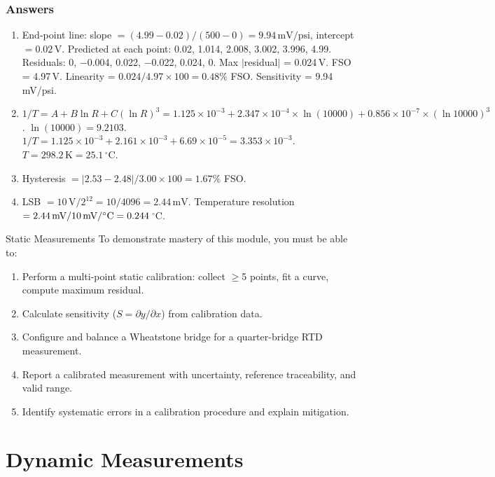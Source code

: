 \documentclass[11pt,letterpaper,twoside,openany]{book}
\newcommand{\degC}{\ensuremath{{}^{\circ}\text{C}}}
\begin{document}
\subsection{Answers}
\begin{enumerate}[leftmargin=1.5em]
\item End-point line: slope $= (4.99 - 0.02)/(500 - 0) = 9.94\,\text{mV/psi}$, intercept $= 0.02\,\text{V}$. Predicted at each point: 0.02, 1.014, 2.008, 3.002, 3.996, 4.99. Residuals: 0, $-$0.004, 0.022, $-$0.022, 0.024, 0. Max $|$residual$|$ = 0.024\,V. FSO = 4.97\,V. Linearity = $0.024/4.97 \times 100 = 0.48\%$ FSO. Sensitivity = 9.94\,mV/psi.
\item $1/T = A + B \ln R + C (\ln R)^3 = 1.125 \times 10^{-3} + 2.347 \times 10^{-4} \times \ln(10000) + 0.856 \times 10^{-7} \times (\ln 10000)^3$. $\ln(10000) = 9.2103$. $1/T = 1.125 \times 10^{-3} + 2.161 \times 10^{-3} + 6.69 \times 10^{-5} = 3.353 \times 10^{-3}$. $T = 298.2\,\text{K} = 25.1$\,\degC{}.
\item Hysteresis $= |2.53 - 2.48| / 3.00 \times 100 = 1.67\%$ FSO.
\item LSB $= 10\,\text{V} / 2^{12} = 10/4096 = 2.44\,\text{mV}$. Temperature resolution $= 2.44\,\text{mV} / 10\,\text{mV/\degC{}} = 0.244\,$\degC{}.
\end{enumerate}



\begin{masterycheckbox}{Static Measurements}
To demonstrate mastery of this module, you must be able to:
\begin{enumerate}[nosep,leftmargin=1.5em]
\item Perform a multi-point static calibration: collect $\geq$5 points, fit a curve, compute maximum residual.
\item Calculate sensitivity ($S = \partial y/\partial x$) from calibration data.
\item Configure and balance a Wheatstone bridge for a quarter-bridge RTD measurement.
\item Report a calibrated measurement with uncertainty, reference traceability, and valid range.
\item Identify systematic errors in a calibration procedure and explain mitigation.
\end{enumerate}
\end{masterycheckbox}

\chapter{Dynamic Measurements}
\label{ch:dynamic}
\end{document}
